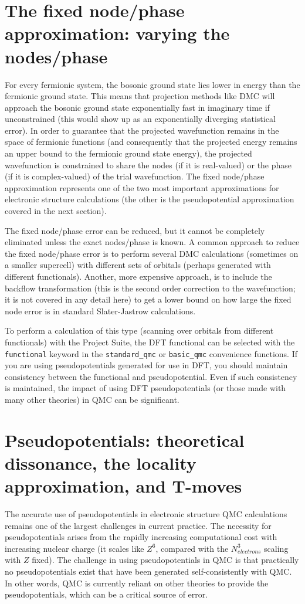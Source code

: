 \documentclass[oneside,11pt]{memoir}
\numberwithin{equation}{section}
\begin{document}
\section{The fixed node/phase approximation: varying the nodes/phase}
For every fermionic system, the bosonic ground state lies lower in energy than 
the fermionic ground state.  This means that projection methods like DMC 
will approach the bosonic ground state exponentially fast in imaginary time if 
unconstrained (this would show up as an exponentially diverging statistical 
error).  In order to guarantee that the projected wavefunction remains in the 
space of fermionic functions (and consequently that the projected energy 
remains an upper bound to the fermionic ground state energy), the projected 
wavefunction is constrained to share the nodes (if it is real-valued) or the 
phase (if it is complex-valued) of the trial wavefunction.  The fixed 
node/phase approximation represents one of the two most important 
approximations for electronic structure calculations (the other is the 
pseudopotential approximation covered in the next section).  

The fixed node/phase error can be reduced, but it cannot be completely 
eliminated unless the exact nodes/phase is known.  A common approach to reduce 
the fixed node/phase error is to perform several DMC calculations (sometimes 
on a smaller supercell) with different sets of orbitals (perhaps generated 
with different functionals).  Another, more expensive approach, is to include 
the backflow transformation (this is the second order correction to the 
wavefunction; it is not covered in any detail here) to get a lower bound on 
how large the fixed node error is in standard Slater-Jastrow calculations.

To perform a calculation of this type (scanning over orbitals from different 
functionals) with the Project Suite, the DFT functional can be selected 
with the \texttt{functional} keyword in the  \texttt{standard\_qmc} or 
\texttt{basic\_qmc} convenience functions.  If you are using pseudopotentials 
generated for use in DFT, you should maintain consistency between the 
functional and pseudopotential.  Even if such consistency is maintained, the 
impact of using DFT pseudopotentials (or those made with many other theories) 
in QMC can be significant.


\section{Pseudopotentials: theoretical dissonance, the locality approximation, and T-moves}
The accurate use of pseudopotentials in electronic structure QMC calculations 
remains one of the largest challenges in current practice.  The necessity for 
pseudopotentials arises from the rapidly increasing computational cost with 
increasing nuclear charge (it scales like $Z^6$, compared with the 
$N_{electrons}^3$ scaling with $Z$ fixed).  The challenge in using 
pseudopotentials in QMC is that practically no pseudopotentials exist that have 
been generated self-consistently with QMC.  In other words, QMC is currently 
reliant on other theories to provide the pseudopotentials, which can be a 
critical source of error.
\end{document}
